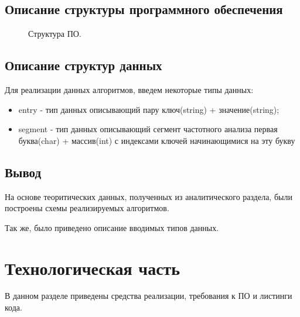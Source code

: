\documentclass[12pt,a4paper]{report}
\begin{document}
\newpage
\newpage
\section{Описание структуры программного обеспечения}

\begin{figure}[ht!]
	\caption{Структура ПО.}
\end{figure}

\newpage
\section{Описание структур данных}

Для реализации данных алгоритмов, введем некоторые типы данных:

\begin{itemize}
	\item entry - тип данных описывающий пару ключ(string) + значение(string); 
	\item segment - тип данных описывающий сегмент частотного анализа первая буква(char) + массив(int) с индексами ключей начинающимися на эту букву
\end{itemize}


\section*{Вывод}

На основе теоритических данных, полученных из аналитического раздела, были построены схемы реализируемых алгоритмов.

Так же, было приведено описание вводимых типов данных.

\newpage
\chapter{Технологическая часть} 

В данном разделе приведены средства реализации, требования к ПО и листинги кода.
\end{document}
